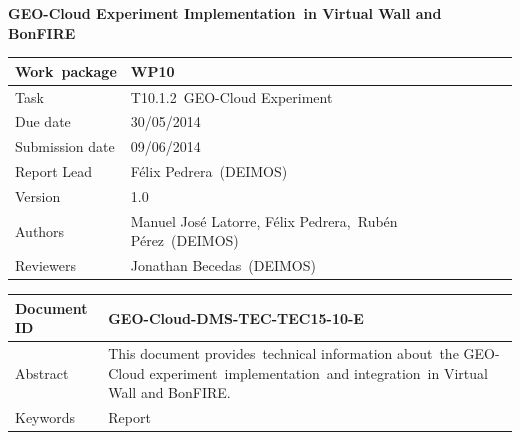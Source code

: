 \documentclass[a4paper]{article}
\begin{document}
\bigskip


\bigskip

{\centering\bfseries
GEO-Cloud Experiment Implementation\ in Virtual Wall and BonFIRE
\par}


\bigskip

\begin{flushleft}
\tablehead{}
\begin{supertabular}{|m{1.9649599in}|m{4.27466in}|}
\hline
Work\ package &
WP10\\\hline
Task &
T10.1.2\ GEO-Cloud Experiment\\\hline
Due date &
30/05/2014\\\hline
Submission date &
09/06/2014\\\hline
Report Lead &
F\'elix Pedrera\ (DEIMOS)\\\hline
Version &
1.0\\\hline
Authors &
 Manuel Jos\'e Latorre, F\'elix
Pedrera,\ Rub\'en P\'erez\ (DEIMOS)\ \\\hline
Reviewers &
Jonathan Becedas\ (DEIMOS)\\\hline
\end{supertabular}
\end{flushleft}

\bigskip


\bigskip

\begin{flushleft}
\tablehead{}
\begin{supertabular}{|m{1.9649599in}|m{4.27466in}|}
\hline
\bfseries Document ID &
\foreignlanguage{spanish}{\textbf{GEO-Cloud-DMS-TEC-TEC15-10-E}}\\\hline
Abstract &
This document provides\ technical information about\ the GEO-Cloud
experiment\ implementation\ and integration\ in Virtual Wall and
BonFIRE.\\\hline
Keywords &
Report\\\hline
\end{supertabular}
\end{flushleft}

\bigskip


\bigskip
\end{document}
